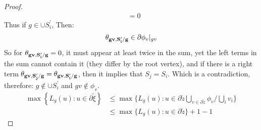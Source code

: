 \begin{proof}
\begin{equation*}
\begin{split}
  & = 0 
  \end{split}
\end{equation*}
Thus if  $g  \in \cup S^{\prime}_{i}$, Then: 
\begin{equation*}
  \begin{split}
    \mathbf{\theta_{gv ,S^{\prime}_{i}/g} }  \in \partial \phi_{v}|_{gv} 
  \end{split}
\end{equation*}
So for $\mathbf{\theta_{gv ,S^{\prime}_{i}/g} } = 0$, it must appear at least twice in the sum, yet the left terms in the sum cannot contain it (they differ by the root vertex), and if there is a right term $\mathbf{\theta_{gv ,S^{\prime}_{j}/g} } = \mathbf{\theta_{gv ,S^{\prime}_{i}/g} }$, then it implies that $S_{j} = S_{i}$. Which is a contradiction, therefore: $g \notin \cup S^{\prime}_{i}$ and $gv \notin \phi_{v}$. 
\begin{equation*}
  \begin{split}
    \max \left\{ L_{g}(u) : u \in \partial \tilde{\xi} \right\} & \le \max \big\{ L_{g}(u) : u \in  \partial \tilde{z} \bigcup_{v \in \partial \tilde{z} } \phi_{v} \big/ \bigcup_{i} v_{i} \big\}  \\ 
    & \le  \max \big\{ L_{g}(u) : u \in \partial \tilde{z} \big\} + 1 - 1
  \end{split}
\end{equation*}
\end{proof}




